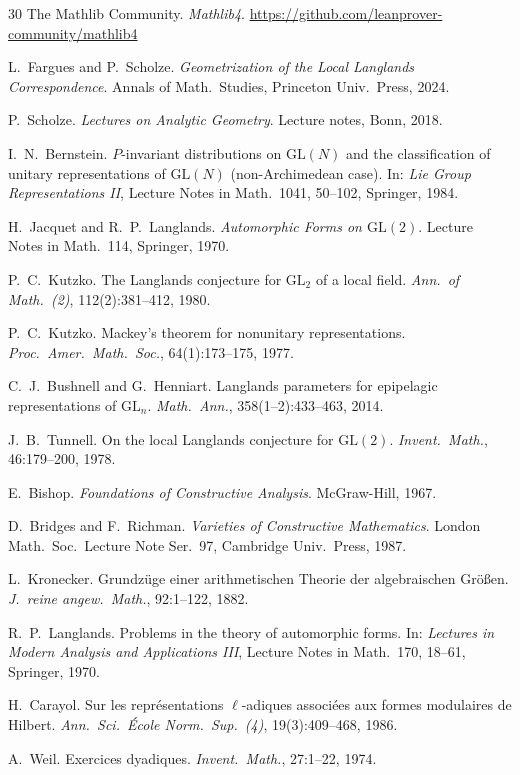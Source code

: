 \documentclass[11pt]{article}
\theoremstyle{plain}
\theoremstyle{definition}
\theoremstyle{remark}
\newcommand{\GL}{\mathrm{GL}}
\begin{document}
\begin{thebibliography}{30}
The Mathlib Community.
\newblock \emph{Mathlib4}.
\newblock \url{https://github.com/leanprover-community/mathlib4}

L.~Fargues and P.~Scholze.
\newblock \emph{Geometrization of the Local Langlands
  Correspondence}.
\newblock Annals of Math.\ Studies, Princeton Univ.\ Press, 2024.

P.~Scholze.
\newblock \emph{Lectures on Analytic Geometry}.
\newblock Lecture notes, Bonn, 2018.

I.~N.~Bernstein.
\newblock $P$-invariant distributions on $\GL(N)$ and the
  classification of unitary representations of $\GL(N)$
  (non-Archimedean case).
\newblock In: \emph{Lie Group Representations II}, Lecture
  Notes in Math.~1041, 50--102, Springer, 1984.

H.~Jacquet and R.~P.~Langlands.
\newblock \emph{Automorphic Forms on $\GL(2)$}.
\newblock Lecture Notes in Math.~114, Springer, 1970.

P.~C.~Kutzko.
\newblock The Langlands conjecture for $\GL_2$ of a local field.
\newblock \emph{Ann.\ of Math.\ (2)}, 112(2):381--412, 1980.

P.~C.~Kutzko.
\newblock Mackey's theorem for nonunitary representations.
\newblock \emph{Proc.\ Amer.\ Math.\ Soc.}, 64(1):173--175,
  1977.

C.~J.~Bushnell and G.~Henniart.
\newblock Langlands parameters for epipelagic representations
  of $\GL_n$.
\newblock \emph{Math.\ Ann.}, 358(1--2):433--463, 2014.

J.~B.~Tunnell.
\newblock On the local Langlands conjecture for $\GL(2)$.
\newblock \emph{Invent.\ Math.}, 46:179--200, 1978.

E.~Bishop.
\newblock \emph{Foundations of Constructive Analysis}.
\newblock McGraw-Hill, 1967.

D.~Bridges and F.~Richman.
\newblock \emph{Varieties of Constructive Mathematics}.
\newblock London Math.\ Soc.\ Lecture Note Ser.~97,
  Cambridge Univ.\ Press, 1987.

L.~Kronecker.
\newblock Grundz\"uge einer arithmetischen Theorie der
  algebraischen Gr\"o\ss en.
\newblock \emph{J.~reine angew.\ Math.}, 92:1--122, 1882.

R.~P.~Langlands.
\newblock Problems in the theory of automorphic forms.
\newblock In: \emph{Lectures in Modern Analysis and
  Applications III}, Lecture Notes in Math.~170, 18--61,
  Springer, 1970.

H.~Carayol.
\newblock Sur les repr\'esentations $\ell$-adiques associ\'ees
  aux formes modulaires de Hilbert.
\newblock \emph{Ann.\ Sci.\ \'Ecole Norm.\ Sup.\ (4)},
  19(3):409--468, 1986.

A.~Weil.
\newblock Exercices dyadiques.
\newblock \emph{Invent.\ Math.}, 27:1--22, 1974.

\end{thebibliography}
\end{document}
